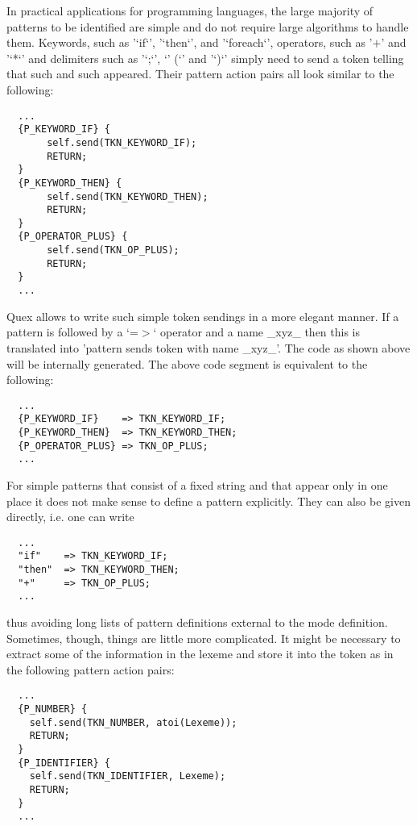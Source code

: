 In practical applications for programming languages, the large majority of
patterns to be identified are simple and do not require large algorithms to
handle them. Keywords, such as '`if`', '`then`', and '`foreach`',
operators, such as '$+$' and '`*`' and delimiters such as '`;`', `'
  (`' and '`)`' simply need to send a token telling that such and such
appeared. Their pattern action pairs all look similar to the following:

\begin{lstlisting}
  ...
  {P_KEYWORD_IF} {
       self.send(TKN_KEYWORD_IF);
       RETURN;
  }
  {P_KEYWORD_THEN} {
       self.send(TKN_KEYWORD_THEN);
       RETURN;
  }
  {P_OPERATOR_PLUS} {
       self.send(TKN_OP_PLUS);
       RETURN;
  }
  ...
\end{lstlisting}

Quex allows to write such simple token sendings in a more elegant manner.
If a pattern is followed by a `=$>$` operator and a name _xyz_ then
this is translated into 'pattern sends token with name _xyz_'. The code as
shown above will be internally generated. The above code segment is equivalent
to the following:

\begin{lstlisting}
  ...
  {P_KEYWORD_IF}    => TKN_KEYWORD_IF;
  {P_KEYWORD_THEN}  => TKN_KEYWORD_THEN;
  {P_OPERATOR_PLUS} => TKN_OP_PLUS;
  ...
\end{lstlisting}

For simple patterns that consist of a fixed string and that appear only in one
place it does not make sense to define a pattern explicitly. They can also be
given directly, i.e. one can write

\begin{lstlisting}
  ...
  "if"    => TKN_KEYWORD_IF;
  "then"  => TKN_KEYWORD_THEN;
  "+"     => TKN_OP_PLUS;
  ...
\end{lstlisting}

thus avoiding long lists of pattern definitions external to the mode
definition. Sometimes, though, things are little more complicated.  It might
be necessary to extract some of the information in the lexeme and store it
into the token as in the following pattern action pairs:

\begin{lstlisting}
  ...
  {P_NUMBER} {
    self.send(TKN_NUMBER, atoi(Lexeme));
    RETURN; 
  }
  {P_IDENTIFIER} { 
    self.send(TKN_IDENTIFIER, Lexeme); 
    RETURN; 
  }
  ...
\end{lstlisting}

